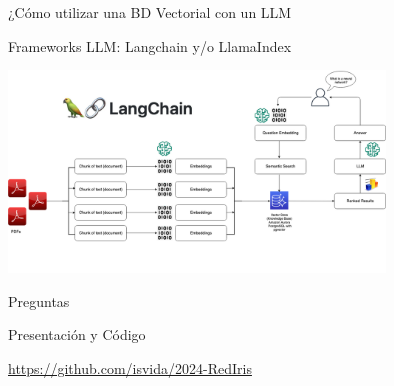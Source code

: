 \documentclass[table, unknownkeysallowed, 10pt]{beamer}
\begin{document}
\begin{frame}{¿Cómo utilizar una BD Vectorial con un LLM}
    \begin{block}{Frameworks LLM: Langchain y/o LlamaIndex}
    \begin{center}
        \includegraphics[width=10cm]{imagenes/langchain.png}
    \end{center}
\end{block}
\end{frame}

\begin{frame}{Preguntas}
    \begin{block}{Presentación y Código}
    \begin{center}
        \href{https://github.com/isvida/2024-RedIris}{https://github.com/isvida/2024-RedIris}
    \end{center}
\end{block}
\end{frame}
\end{document}
